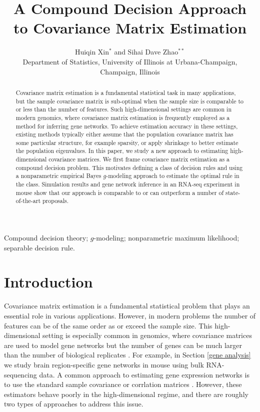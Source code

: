 \documentclass[useAMS,referee,usenatbib]{biom}
\title[Coumpound Decision Covariance Matrix Estimation]{A Compound Decision Approach to Covariance Matrix Estimation}
\author{Huiqin Xin$^{*}$\email{huiqinx2@illinois.edu } and
Sihai Dave Zhao$^{**}$\email{sdzhao@illinois.edu} \\
Department of Statistics, University of Illinois at Urbana-Champaign, Champaign, Illinois}
\begin{document}

\label{firstpage}
\begin{abstract}
  Covariance matrix estimation is a fundamental statistical task in many applications, but the sample covariance matrix is sub-optimal when the sample size is comparable to or less than the number of features. Such high-dimensional settings are common in modern genomics, where covariance matrix estimation is frequently employed as a method for inferring gene networks. To achieve estimation accuracy in these settings, existing methods typically either assume that the population covariance matrix has some particular structure, for example sparsity, or apply shrinkage to better estimate the population eigenvalues. In this paper, we study a new approach to estimating high-dimensional covariance matrices. We first frame covariance matrix estimation as a compound decision problem. This motivates defining a class of decision rules and using a nonparametric empirical Bayes $g$-modeling approach to estimate the optimal rule in the class. Simulation results and gene network inference in an RNA-seq experiment in mouse show that our approach is comparable to or can outperform a number of state-of-the-art proposals.
\end{abstract}

\begin{keywords}
Compound decision theory; $g$-modeling; nonparametric maximum likelihood; separable decision rule.
\end{keywords}

\maketitle

\section{Introduction}
\label{introduction}

Covariance matrix estimation is a fundamental statistical problem that plays an essential role in various applications. However, in modern problems the number of features can be of the same order as or exceed the sample size. This high-dimensional setting is especially common in genomics, where covariance matrices are used to model gene networks but the number of genes can be much larger than the number of biological replicates \citep{schafer2005shrinkage, markowetz2007inferring}. For example, in Section \ref{gene analysis} we study brain region-specific gene networks in mouse using bulk RNA-sequencing data. A common approach to estimating gene expression networks is to use the standard sample covariance or corrlation matrices \citep{langfelder2008wgcna, zhang2005general}. However, these estimators behave poorly in the high-dimensional regime, and there are roughly two types of approaches to address this issue.
\end{document}
